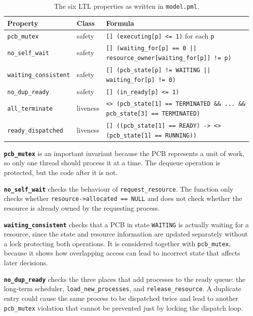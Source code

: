 \documentclass[10pt,a4paper]{article}
\newcommand{\code}[1]{\texttt{#1}}
\begin{document}
\begin{table}[htbp]
\centering
\caption{The six LTL properties as written in \code{model.pml}.}
\label{tab:props}
\begin{tabular}{l l p{9.4cm}}
\toprule
\textbf{Property} & \textbf{Class} & \textbf{Formula} \\
\midrule
\code{pcb\_mutex} & safety &
\code{[] (executing[p] <= 1)} for each \code{p} \\
\addlinespace
\code{no\_self\_wait} & safety &
\code{[] (waiting\_for[p] == 0 || resource\_owner[waiting\_for[p]] != p)} \\
\addlinespace
\code{waiting\_consistent} & safety &
\code{[] (pcb\_state[p] != WAITING || waiting\_for[p] != 0)} \\
\addlinespace
\code{no\_dup\_ready} & safety &
\code{[] (in\_ready[p] <= 1)} \\
\addlinespace
\code{all\_terminate} & liveness &
\code{<> (pcb\_state[1] == TERMINATED \&\& ... \&\& pcb\_state[3] == TERMINATED)} \\
\addlinespace
\code{ready\_dispatched} & liveness &
\code{[] ((pcb\_state[1] == READY) -> <> (pcb\_state[1] == RUNNING))} \\
\bottomrule
\end{tabular}
\end{table}

\noindent
\textbf{\code{pcb\_mutex}} is an important invariant because the PCB 
represents a unit of work, so only one thread should process it at a time. 
The dequeue operation is protected, but the code after it is not.

\medskip\noindent
\textbf{\code{no\_self\_wait}} checks the behaviour of \code{request\_resource}. 
The function only checks whether \code{resource->allocated == NULL} and does 
not check whether the resource is already owned by the requesting process. 

\medskip\noindent
\textbf{\code{waiting\_consistent}} checks that a PCB in state \code{WAITING}
is actually waiting for a resource, since the state and resource information
are updated separately without a lock protecting both operations. It is
considered together with \code{pcb\_mutex}, because it shows how overlapping
access can lead to incorrect state that affects later decisions.

\medskip\noindent
\textbf{\code{no\_dup\_ready}} checks the three places that add processes 
to the ready queue: the long-term scheduler, \code{load\_new\_processes}, 
and \code{release\_resource}. A duplicate entry could cause the same process 
to be dispatched twice and lead to another \code{pcb\_mutex} violation that 
cannot be prevented just by locking the dispatch loop.
\end{document}
